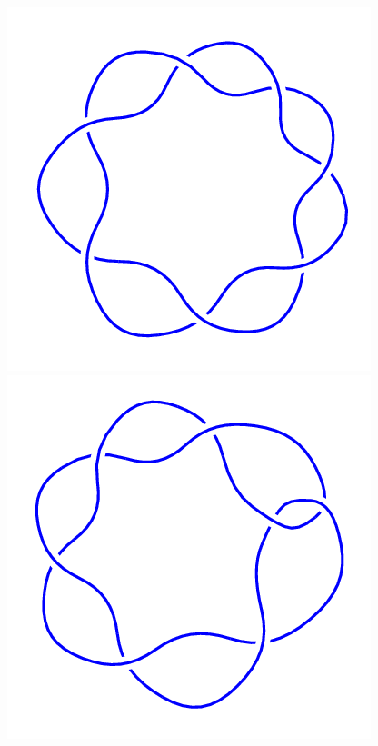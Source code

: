 \begin{figure}[H]
\begin{minipage}[b]{.18\linewidth}
	\end{minipage}
	\begin{minipage}[b]{.18\linewidth}
		\centering
		\includegraphics[width=\linewidth]{../data/7_1.png}
	\end{minipage}
	\begin{minipage}[b]{.18\linewidth}
		\centering
		\includegraphics[width=\linewidth]{../data/7_2.png}

\end{minipage}
\end{figure}

